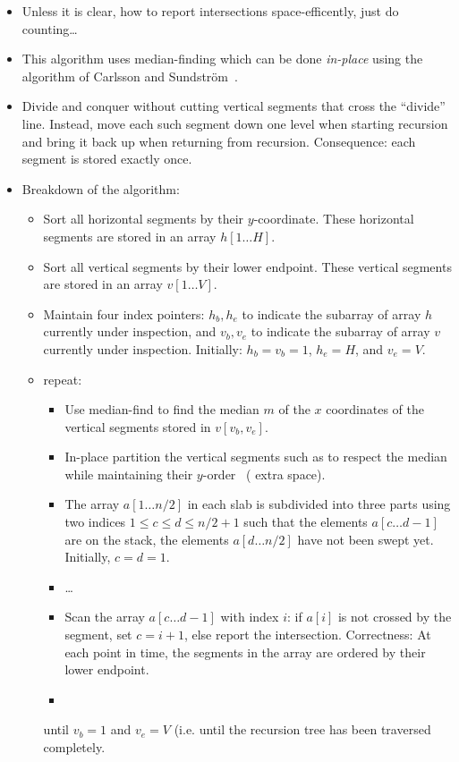 \begin{itemize}
\item  Unless it is clear, how to report intersections
  space-efficently, just do counting\ldots
\item  This algorithm uses median-finding which can be done
  \emph{in-place} using the algorithm of Carlsson and 
  Sundstr\"om~\cite{carlsson:linear}. 
\item  Divide and conquer without cutting vertical segments that cross
  the ``divide'' line. Instead, move each such segment down one
  level when starting recursion and bring it back up when returning
  from recursion. Consequence: each segment is stored exactly once.
\item Breakdown of the algorithm:
  \begin{itemize}
  \item Sort all horizontal segments by their $y$-coordinate. These
    horizontal segments are stored in an array $h[1\ldots H]$.
  \item  Sort all vertical segments by their lower endpoint. These
    vertical segments are stored in an array $v[1\ldots V]$.
  \item  Maintain four index pointers: $h_b,h_e$ to indicate the
    subarray of array $h$ currently under inspection, and $v_b,v_e$ to
    indicate the subarray of array $v$ currently under inspection.
    Initially: $h_b = v_b = 1$, $h_e = H$, and $v_e=V$.
  \item repeat:
    \begin{itemize}
    \item  Use median-find to find the median $m$ of the $x$ coordinates
      of the vertical segments stored in $v[v_b,v_e]$.
    \item In-place partition the vertical segments such as to respect
      the median while maintaining their
      $y$-order~\cite{katajainen:partitioning} ( extra space).
      
    \item The array $a[1\ldots n/2]$ in each slab is subdivided into
      three parts using two indices $1\leq c\leq d \leq n/2+1$ such that
      the elements $a[c\ldots d-1]$ are on the stack, the elements
      $a[d\ldots n/2]$ have not been swept yet. Initially, $c=d=1$.
    \item \ldots
    \item Scan the array $a[c\ldots d-1]$ with index $i$: if $a[i]$ is
      not crossed by the segment, set $c=i+1$, else report the
      intersection. Correctness: At each point in time, the segments in
      the array are ordered by their lower endpoint.
    \item  
    \end{itemize}
    until $v_b=1$ and $v_e = V$ (i.e. until the recursion tree has
    been traversed completely.
  \end{itemize}
\end{itemize}


